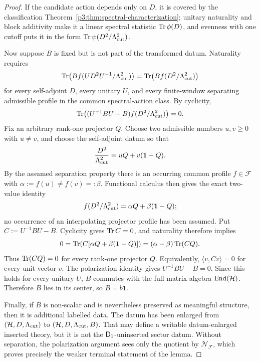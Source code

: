 \documentclass[12pt,a4paper]{article}
\begin{document}
\begin{proof}
If the candidate action depends only on \(D\), it is covered by the classification
Theorem~\ref{p3:thm:spectral-characterization}; unitary naturality and block additivity
make it a linear spectral statistic \(\operatorname{Tr}\phi(D)\), and evenness with one cutoff puts it in
the form \(\operatorname{Tr}\psi(D^2/\Lambda_{\mathrm{cut}}^2)\).

Now suppose \(B\) is fixed but is not part of the transformed datum.  Naturality requires
\[
        \operatorname{Tr}\!\left(B f(UD^2U^{-1}/\Lambda_{\mathrm{cut}}^2)\right)
        =
        \operatorname{Tr}\!\left(B f(D^2/\Lambda_{\mathrm{cut}}^2)\right)
\]
for every self-adjoint \(D\), every unitary \(U\), and every finite-window separating admissible profile in the common spectral-action class.  By cyclicity,
\[
        \operatorname{Tr}\!\left((U^{-1}BU-B)f(D^2/\Lambda_{\mathrm{cut}}^2)\right)=0.
\]
Fix an arbitrary rank-one projector \(Q\).  Choose two admissible numbers
\(u,v\ge0\) with \(u\ne v\), and choose the self-adjoint datum so that
\[
 \frac{D^2}{\Lambda_{\mathrm{cut}}^2}=uQ+v(\mathbf1-Q).
\]
By the assumed separation property there is an occurring common profile
\(f\in\mathcal F\) with \(\alpha:=f(u)\ne f(v)=:\beta\).  Functional
calculus then gives the exact two-value identity
\[
 f(D^2/\Lambda_{\mathrm{cut}}^2)=\alpha Q+\beta(\mathbf1-Q);
\]
no occurrence of an interpolating projector profile has been assumed.  Put
\(C:=U^{-1}BU-B\).  Cyclicity gives \(\operatorname{Tr} C=0\), and naturality therefore
implies
\[
 0=\operatorname{Tr}\!\left(C[\alpha Q+\beta(\mathbf1-Q)]\right)
   =(\alpha-\beta)\operatorname{Tr}(CQ).
\]
Thus \(\operatorname{Tr}(CQ)=0\) for every rank-one projector \(Q\).  Equivalently,
\(\langle v,Cv\rangle=0\) for every unit vector \(v\).  The polarization
identity gives \(U^{-1}BU-B=0\).  Since this holds for every unitary \(U\), \(B\) commutes
with the full matrix algebra \(\operatorname{End}(\mathcal H)\).  Therefore \(B\) lies in its center,
so \(B=b\mathbf 1\).

Finally, if \(B\) is non-scalar and is nevertheless preserved as meaningful structure,
then it is additional labelled data.  The datum has been enlarged from
\((\mathcal H,D,\Lambda_{\mathrm{cut}})\) to \((\mathcal H,D,\Lambda_{\mathrm{cut}},B)\).  That may define a writable
datum-enlarged inserted theory, but it is not the \(\mathsf{D}_1\)-uninserted sector datum.
Without separation, the polarization argument sees only the quotient by
\(\mathcal N_{\mathcal F}\), which proves precisely the weaker terminal
statement of the lemma.
\end{proof}
\end{document}
